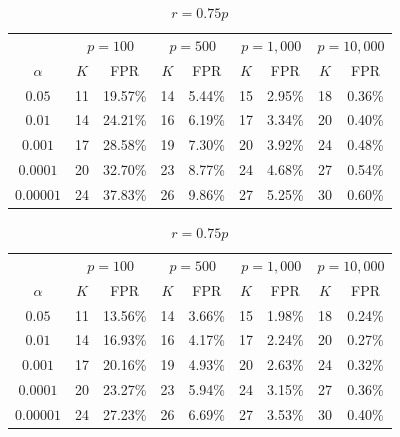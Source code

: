 \documentclass[runningheads]{llncs}
\begin{document}
\begin{table}[H]

\begin{subtable}{\textwidth}
\centering
\caption{$r = 0.50p$}
\begin{tabular}{c|cc|cc|cc|cc}
\toprule
& \multicolumn{2}{c|}{$p = 100$}
& \multicolumn{2}{c|}{$p = 500$}
& \multicolumn{2}{c|}{$p = 1{,}000$}
& \multicolumn{2}{c}{$p = 10{,}000$} \\
$\alpha$
& $K$ & FPR
& $K$ & FPR
& $K$ & FPR
& $K$ & FPR \\
\midrule
$0.05$    & 11 & 19.57\% & 14 & 5.44\% & 15 & 2.95\% & 18 & 0.36\% \\
$0.01$    & 14 & 24.21\% & 16 & 6.19\% & 17 & 3.34\% & 20 & 0.40\% \\
$0.001$   & 17 & 28.58\% & 19 & 7.30\% & 20 & 3.92\% & 24 & 0.48\% \\
$0.0001$  & 20 & 32.70\% & 23 & 8.77\% & 24 & 4.68\% & 27 & 0.54\% \\
$0.00001$ & 24 & 37.83\% & 26 & 9.86\% & 27 & 5.25\% & 30 & 0.60\% \\
\bottomrule
\end{tabular}
\end{subtable}


\begin{subtable}{\textwidth}
\centering
\caption{$r = 0.75p$}
\begin{tabular}{c|cc|cc|cc|cc}
\toprule
& \multicolumn{2}{c|}{$p = 100$}
& \multicolumn{2}{c|}{$p = 500$}
& \multicolumn{2}{c|}{$p = 1{,}000$}
& \multicolumn{2}{c}{$p = 10{,}000$} \\
$\alpha$
& $K$ & FPR
& $K$ & FPR
& $K$ & FPR
& $K$ & FPR \\
\midrule
$0.05$    & 11 & 13.56\% & 14 & 3.66\% & 15 & 1.98\% & 18 & 0.24\% \\
$0.01$    & 14 & 16.93\% & 16 & 4.17\% & 17 & 2.24\% & 20 & 0.27\% \\
$0.001$   & 17 & 20.16\% & 19 & 4.93\% & 20 & 2.63\% & 24 & 0.32\% \\
$0.0001$  & 20 & 23.27\% & 23 & 5.94\% & 24 & 3.15\% & 27 & 0.36\% \\
$0.00001$ & 24 & 27.23\% & 26 & 6.69\% & 27 & 3.53\% & 30 & 0.40\% \\
\bottomrule
\end{tabular}
\end{subtable}



\end{table}
\end{document}
